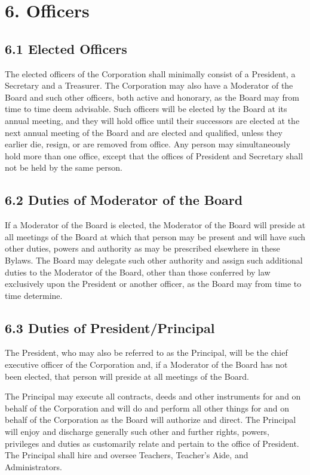 \documentclass[
]{book}
\begin{document}
\section{6. Officers}\label{officers}

\subsection{6.1 Elected Officers}\label{elected-officers}

The elected officers of the Corporation shall minimally consist of a President, a Secretary and a Treasurer. The Corporation may also have a Moderator of the Board and such other officers, both active and honorary, as the Board may from time to time deem advisable. Such officers will be elected by the Board at its annual meeting, and they will hold office until their successors are elected at the next annual meeting of the Board and are elected and qualified, unless they earlier die, resign, or are removed from office. Any person may simultaneously hold more than one office, except that the offices of President and Secretary shall not be held by the same person.

\subsection{6.2 Duties of Moderator of the Board}\label{duties-of-moderator-of-the-board}

If a Moderator of the Board is elected, the Moderator of the Board will preside at all meetings of the Board at which that person may be present and will have such other duties, powers and authority as may be prescribed elsewhere in these Bylaws. The Board may delegate such other authority and assign such additional duties to the Moderator of the Board, other than those conferred by law exclusively upon the President or another officer, as the Board may from time to time determine.

\subsection{6.3 Duties of President/Principal}\label{duties-of-presidentprincipal}

The President, who may also be referred to as the Principal, will be the chief executive officer of the Corporation and, if a Moderator of the Board has not been elected, that person will preside at all meetings of the Board.

The Principal may execute all contracts, deeds and other instruments for and on behalf of the Corporation and will do and perform all other things for and on behalf of the Corporation as the Board will authorize and direct. The Principal will enjoy and discharge generally such other and further rights, powers, privileges and duties as customarily relate and pertain to the office of President. The Principal shall hire and oversee Teachers, Teacher's Aide, and Administrators.
\end{document}
